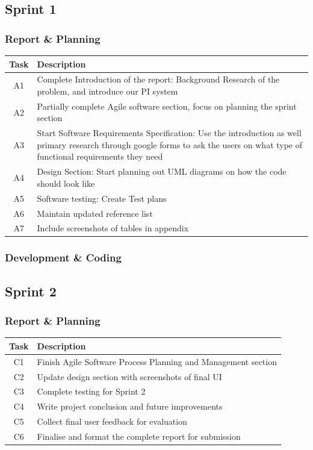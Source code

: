 \documentclass[12pt,a4paper]{article}
\begin{document}
\subsection{Sprint 1}
\subsubsection{Report & Planning}

\renewcommand{\arraystretch}{1.3}
\begin{tabular}{|c|p{12cm}|}
\hline
\textbf{Task} & \textbf{Description} \\
\hline
A1 & Complete Introduction of the report: Background Research of the problem, and introduce our PI system \\
\hline
A2 & Partially complete Agile software section, focus on planning the sprint section \\
\hline
A3 & Start Software Requirements Specification: Use the introduction as well primary research through google forms to ask the users on what type of functional requirements they need \\
\hline
A4 & Design Section: Start planning out UML diagrams on how the code should look like \\
\hline
A5 & Software testing: Create Test plans \\
\hline
A6 & Maintain updated reference list \\
\hline
A7 & Include screenshots of tables in appendix \\
\hline
\end{tabular}

\subsubsection{Development & Coding}

\subsection{Sprint 2}
\subsubsection{Report & Planning}
\renewcommand{\arraystretch}{1.3}
\begin{tabular}{|c|p{12cm}|}
\hline
\textbf{Task} & \textbf{Description} \\
\hline
C1 & Finish Agile Software Process Planning and Management section \\
\hline
C2 & Update design section with screenshots of final UI \\
\hline
C3 & Complete testing for Sprint 2 \\
\hline
C4 & Write project conclusion and future improvements \\
\hline
C5 & Collect final user feedback for evaluation \\
\hline
C6 & Finalise and format the complete report for submission \\
\hline
\end{tabular}
\end{document}
